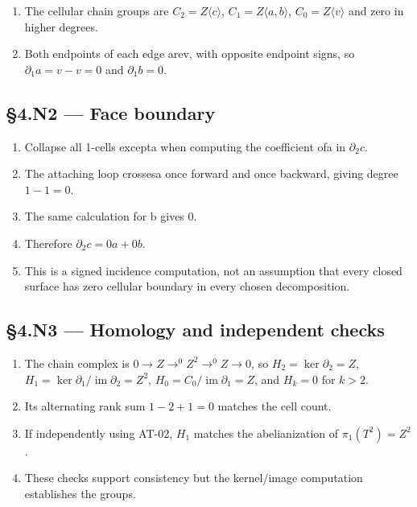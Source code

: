 \documentclass[preprint,12pt,aps,pra,showkeys,amsmath,amssymb,superscriptaddress,floatfix]{revtex4-2}
\theoremstyle{definition}
\theoremstyle{remark}
\begin{document}
\begin{enumerate}
\def\labelenumi{\arabic{enumi}.}
\item
  The cellular chain groups are \(C_{2}=Z\langle c\rangle\),
  \(C_{1}=Z\langle a,b\rangle\), \(C_{0}=Z\langle v\rangle\) and zero in
  higher degrees.
\item
  Both endpoints of each edge arev, with opposite endpoint signs, so
  \(\partial _{1}a=v-v=0\) and \(\partial _{1}b=0\).
\end{enumerate}

\subsection{§4.N2 --- Face boundary}\label{n2-face-boundary}

\begin{enumerate}
\def\labelenumi{\arabic{enumi}.}
\item
  Collapse all 1-cells excepta when computing the coefficient ofa in
  \(\partial _{2}c\).
\item
  The attaching loop crossesa once forward and once backward, giving
  degree \(1-1=0\).
\item
  The same calculation for b gives 0.
\item
  Therefore \(\partial _{2}c=0a+0b\).
\item
  This is a signed incidence computation, not an assumption that every
  closed surface has zero cellular boundary in every chosen
  decomposition.
\end{enumerate}

\subsection{§4.N3 --- Homology and independent
checks}\label{n3-homology-and-independent-checks}

\begin{enumerate}
\def\labelenumi{\arabic{enumi}.}
\item
  The chain complex is \(0\to Z\to ^{0}Z^{2}\to ^{0}Z\to 0\), so
  \(H_{2}=\operatorname{ker} \partial _{2}=Z\),
  \(H_{1}=\operatorname{ker} \partial _{1}/\operatorname{im} \partial _{2}=Z^{2}\),
  \(H_{0}=C_{0}/\operatorname{im} \partial _{1}=Z\), and \(H_k=0\) for
  \(k>2\).
\item
  Its alternating rank sum \(1-2+1=0\) matches the cell count.
\item
  If independently using AT-02, \(H_{1}\) matches the abelianization of
  \(\pi _{1}(T^{2})=Z^{2}\).
\item
  These checks support consistency but the kernel/image computation
  establishes the groups.
\end{enumerate}
\end{document}
